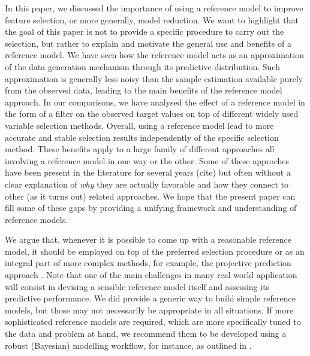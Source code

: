 \documentclass[american,]{article}
\theoremstyle{definition}
\begin{document}
In this paper, we discussed the importance of using a reference model to improve feature selection, or more generally, model reduction. We want to highlight that the goal of this paper is not to provide a specific procedure to carry out the selection, but rather to explain and motivate the general use and benefits of a reference model. 
We have seen how the reference model acts as an approximation of the data generation mechanism through its predictive distribution. Such approximation is generally less noisy than the sample estimation available purely from the observed data, leading to the main benefits of the reference model approach. In our comparisons, we have analysed the effect of a reference model in the form of a filter on the observed target values on top of different widely used variable selection methods. Overall, using a reference model lead to more accurate and stable selection results independently of the specific selection method. These benefits apply to a large family of different approaches all involving a reference model in one way or the other. Some of these approches have been present in the literature for several years (cite) but often without a clear explanation of \emph{why} they are actually favorable and how they connect to other (as it turns out) related approaches. We hope that the present paper can fill some of these gaps by providing a unifying framework and understanding of reference models.


We argue that, whenever it is possible to come up with a reasonable reference model, it should be employed on top of the preferred selection procedure or as an integral part of more complex methods, for example, the projective prediction approach \citep{paper:projpred}. Note that one of the main challenges in many real world application will consist in devising a sensible reference model itself and assessing its predictive performance. We did provide a generic way to build simple reference models, but those may not necessarily be appropriate in all situations. If more sophisticated reference models are required, which are more specifically tuned to the data and problem at hand, we recommend them to be developed using a robust (Bayesian) modelling workflow, for instance, as outlined in \cite{gabry2019visualization}.
\\
\end{document}
